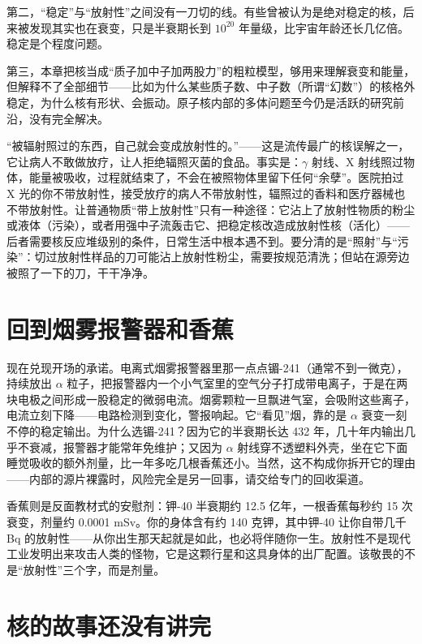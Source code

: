 第二，“稳定”与“放射性”之间没有一刀切的线。有些曾被认为是绝对稳定的核，后来被发现其实也在衰变，只是半衰期长到 $10^{20}$ 年量级，比宇宙年龄还长几亿倍。稳定是个程度问题。

第三，本章把核当成“质子加中子加两股力”的粗粒模型，够用来理解衰变和能量，但解释不了全部细节——比如为什么某些质子数、中子数（所谓“幻数”）的核格外稳定，为什么核有形状、会振动。原子核内部的多体问题至今仍是活跃的研究前沿，没有完全解决。

\begin{wuqu}
“被辐射照过的东西，自己就会变成放射性的。”——这是流传最广的核误解之一，它让病人不敢做放疗，让人拒绝辐照灭菌的食品。事实是：$\gamma$ 射线、X 射线照过物体，能量被吸收，过程就结束了，不会在被照物体里留下任何“余孽”。医院拍过 X 光的你不带放射性，接受放疗的病人不带放射性，辐照过的香料和医疗器械也不带放射性。让普通物质“带上放射性”只有一种途径：它沾上了放射性物质的粉尘或液体（污染），或者用强中子流轰击它、把稳定核改造成放射性核（活化）——后者需要核反应堆级别的条件，日常生活中根本遇不到。要分清的是“照射”与“污染”：切过放射性样品的刀可能沾上放射性粉尘，需要按规范清洗；但站在源旁边被照了一下的刀，干干净净。
\end{wuqu}

\section{回到烟雾报警器和香蕉}

现在兑现开场的承诺。电离式烟雾报警器里那一点点镅-241（通常不到一微克），持续放出 $\alpha$ 粒子，把报警器内一个小气室里的空气分子打成带电离子，于是在两块电极之间形成一股稳定的微弱电流。烟雾颗粒一旦飘进气室，会吸附这些离子，电流立刻下降——电路检测到变化，警报响起。它“看见”烟，靠的是 $\alpha$ 衰变一刻不停的稳定输出。为什么选镅-241？因为它的半衰期长达 432 年，几十年内输出几乎不衰减，报警器才能常年免维护；又因为 $\alpha$ 射线穿不透塑料外壳，坐在它下面睡觉吸收的额外剂量，比一年多吃几根香蕉还小。当然，这不构成你拆开它的理由——内部的源片裸露时，风险完全是另一回事，请交给专门的回收渠道。

香蕉则是反面教材式的安慰剂：钾-40 半衰期约 12.5 亿年，一根香蕉每秒约 15 次衰变，剂量约 0.0001 mSv。你的身体含有约 140 克钾，其中钾-40 让你自带几千 Bq 的放射性——从你出生那天起就是如此，也必将伴随你一生。放射性不是现代工业发明出来攻击人类的怪物，它是这颗行星和这具身体的出厂配置。该敬畏的不是“放射性”三个字，而是剂量。

\section{核的故事还没有讲完}

